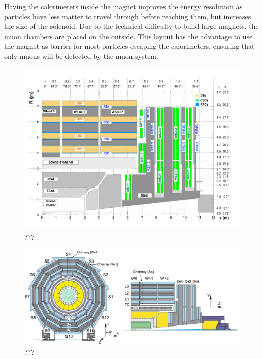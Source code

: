   			Having the calorimeters inside the magnet improves the energy resolution as particles have less matter to travel through before reaching them, but increases the size of the solenoid. Due to the technical difficulty to build large magnets, the muon chambers are placed on the outside. This layout has the advantage to use the magnet as barrier for most particles escaping the calorimeters, ensuring that only muons will be detected by the muon system.

    \begin{figure}[h!]
      \centering
      \includegraphics[width=\textwidth]{img/I-3-cms/quadrant-postls1.pdf}
      \caption{??? \cite{1748-0221-3-08-S08004}.}
      \label{fig:I-3-cms-quadrant}
    \end{figure}

    \begin{figure}[h!]
      \centering
      \includegraphics[width=\textwidth]{img/I-3-cms/muon-numbering.png}
      \caption{??? \cite{Chatrchyan:2009si}.}
      \label{fig:I-3-cms-muon-numbering}
    \end{figure}


